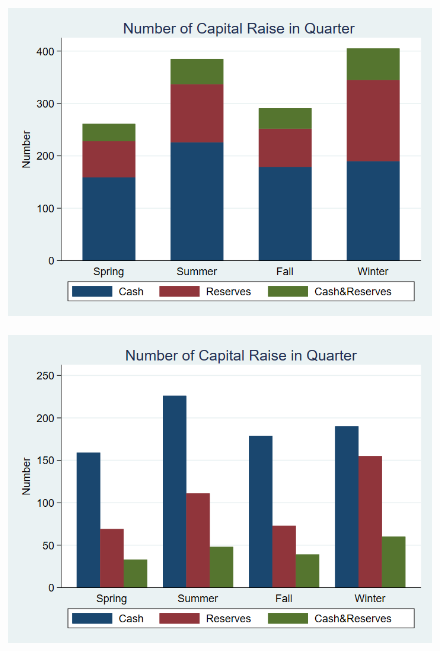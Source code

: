 \documentclass[12pt]{article}
\begin{document}
\begin{figure}
\centering
\includegraphics[width=0.7\linewidth]{QNumber2}
\caption{}
\label{fig:qnumber2}
\end{figure}


\begin{figure}
\centering
\includegraphics[width=0.7\linewidth]{QNumber3}
\caption{}
\label{fig:qnumber3}
\end{figure}
\end{document}
